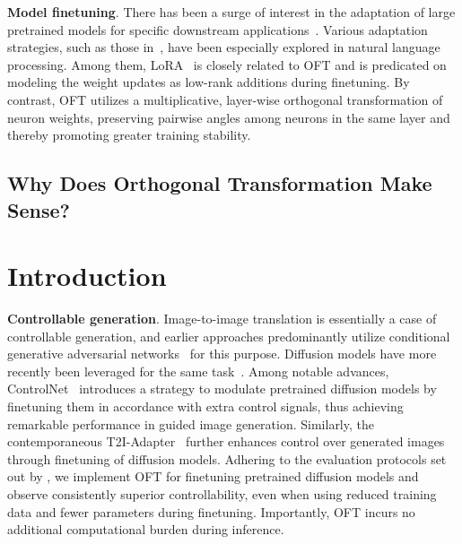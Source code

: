 \textbf{Model finetuning}. There has been a surge of interest in the adaptation of large pretrained models for specific downstream applications~\cite{devlin2018bert,brown2020language,he2022masked}. Various adaptation strategies, such as those in~\cite{hulora2022,houlsby2019parameter,pfeiffer2020adapterfusion}, have been especially explored in natural language processing. Among them, LoRA~\cite{hulora2022} is closely related to OFT and is predicated on modeling the weight updates as low-rank additions during finetuning. By contrast, OFT utilizes a multiplicative, layer-wise orthogonal transformation of neuron weights, preserving pairwise angles among neurons in the same layer and thereby promoting greater training stability.

\subsection{Why Does Orthogonal Transformation Make Sense?}

\section{Introduction}

\textbf{Controllable generation}. Image-to-image translation is essentially a case of controllable generation, and earlier approaches predominantly utilize conditional generative adversarial networks~\cite{isola2017image,zhu2017toward,wang2018high,park2019semantic,choi2018stargan} for this purpose. Diffusion models have more recently been leveraged for the same task~\cite{saharia2022palette,voynov2022sketch,wang2022pretraining}. Among notable advances, ControlNet~\cite{zhang2023adding} introduces a strategy to modulate pretrained diffusion models by finetuning them in accordance with extra control signals, thus achieving remarkable performance in guided image generation. Similarly, the contemporaneous T2I-Adapter~\cite{mou2023t2i} further enhances control over generated images through finetuning of diffusion models. Adhering to the evaluation protocols set out by \cite{zhang2023adding,mou2023t2i}, we implement OFT for finetuning pretrained diffusion models and observe consistently superior controllability, even when using reduced training data and fewer parameters during finetuning. Importantly, OFT incurs no additional computational burden during inference.

